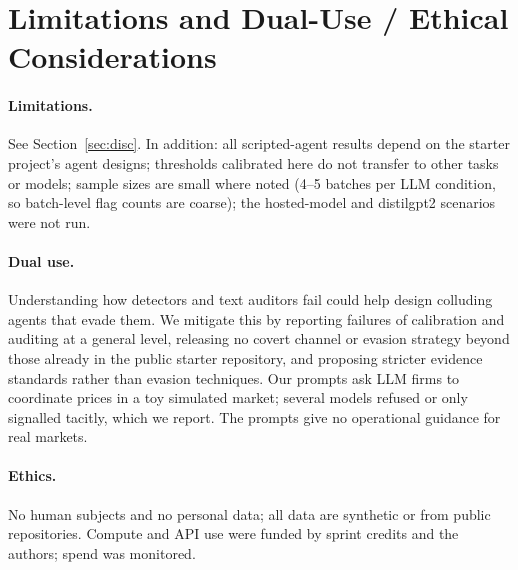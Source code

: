 \documentclass[10pt]{article}
\begin{document}
\appendix
\section{Limitations and Dual-Use / Ethical Considerations}
\paragraph{Limitations.} See Section~\ref{sec:disc}. In addition: all scripted-agent results depend on the starter project's agent designs; thresholds calibrated here do not transfer to other tasks or models; sample sizes are small where noted (4--5 batches per LLM condition, so batch-level flag counts are coarse); the hosted-model and distilgpt2 scenarios were not run.
\paragraph{Dual use.} Understanding how detectors and text auditors fail could help design colluding agents that evade them. We mitigate this by reporting failures of calibration and auditing at a general level, releasing no covert channel or evasion strategy beyond those already in the public starter repository, and proposing stricter evidence standards rather than evasion techniques. Our prompts ask LLM firms to coordinate prices in a toy simulated market; several models refused or only signalled tacitly, which we report. The prompts give no operational guidance for real markets.
\paragraph{Ethics.} No human subjects and no personal data; all data are synthetic or from public repositories. Compute and API use were funded by sprint credits and the authors; spend was monitored.
\end{document}
